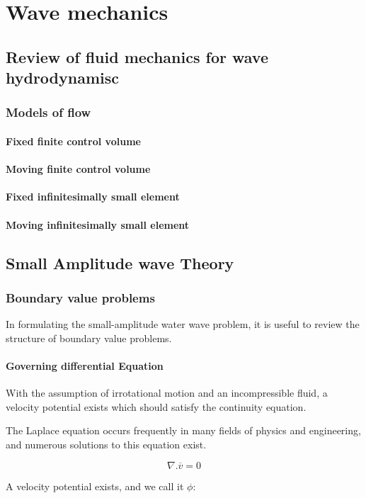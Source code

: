 \documentclass{report}
\begin{document}
\part{Wave mechanics}
\chapter{Review of fluid mechanics for wave hydrodynamisc}
\section{Models of flow}
\subsection{Fixed finite control volume}
\subsection{Moving finite control volume}
\subsection{Fixed infinitesimally small element}
\subsection{Moving infinitesimally small element}
\chapter{Small Amplitude wave Theory}
\section{Boundary value problems}
In formulating the small-amplitude water wave problem, it is useful to review the structure of boundary value problems.

\subsection{Governing differential Equation}
With the assumption of irrotational motion and an incompressible fluid, a velocity potential exists which should satisfy the continuity equation.

The Laplace equation occurs frequently in many fields of physics and engineering, and numerous solutions to this equation exist.

\[ \nabla . \overline{v} =0 \]

A velocity potential exists, and we call it \( \phi \):
\end{document}
